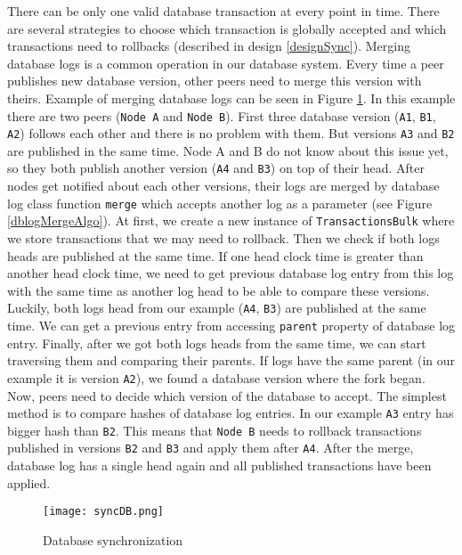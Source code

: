 There can be only one valid database transaction at every point in time. There are several strategies to choose which transaction is globally accepted and which transactions need to rollbacks (described in design \ref{designSync}). Merging database logs is a common operation in our database system. Every time a peer publishes new database version, other peers need to merge this version with theirs. Example of merging database logs can be seen in Figure \ref{syncDB}. In this example there are two peers (\texttt{Node A} and \texttt{Node B}). First three database version (\texttt{A1}, \texttt{B1}, \texttt{A2}) follows each other and there is no problem with them. But versions \texttt{A3} and \texttt{B2} are published in the same time. Node A and B do not know about this issue yet, so they both publish another version (\texttt{A4} and \texttt{B3}) on top of their head. After nodes get notified about each other versions, their logs are merged by database log class function \texttt{merge} which accepts another log as a parameter (see Figure \ref{dblogMergeAlgo}). At first, we create a new instance of \texttt{TransactionsBulk} where we store transactions that we may need to rollback. Then we check if both logs heads are published at the same time. If one head clock time is greater than another head clock time, we need to get previous database log entry from this log with the same time as another log head to be able to compare these versions. Luckily, both logs head from our example (\texttt{A4}, \texttt{B3}) are published at the same time. We can get a previous entry from accessing \texttt{parent} property of database log entry. Finally, after we got both logs heads from the same time, we can start traversing them and comparing their parents. If logs have the same parent (in our example it is version \texttt{A2}), we found a database version where the fork began. Now, peers need to decide which version of the database to accept. The simplest method is to compare hashes of database log entries. In our example \texttt{A3} entry has bigger hash than \texttt{B2}. This means that \texttt{Node B} needs to rollback transactions published in versions \texttt{B2} and \texttt{B3} and apply them after \texttt{A4}. After the merge, database log has a single head again and all published transactions have been applied.

\begin{figure}[h]
    \centering
    \texttt{[image: syncDB.png]}
    \caption{Database synchronization}
    \label{syncDB}
\end{figure}

